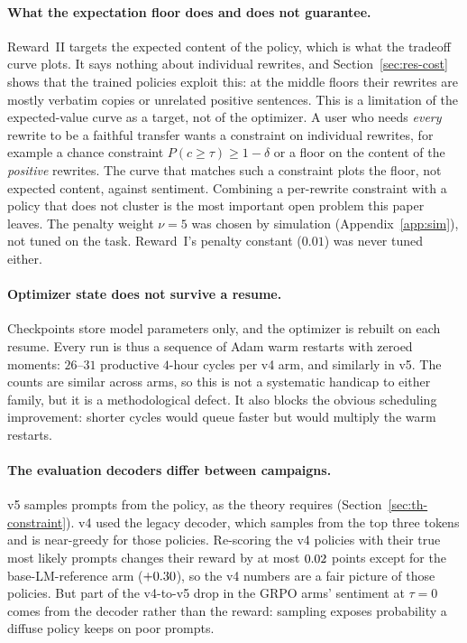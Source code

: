 \paragraph{What the expectation floor does and does not guarantee.}
Reward~II targets the expected content of the policy, which is what the
tradeoff curve plots. It says nothing about individual rewrites, and
Section~\ref{sec:res-cost} shows that the trained policies exploit this: at
the middle floors their rewrites are mostly verbatim copies or unrelated
positive sentences. This is a limitation of the expected-value curve as a
target, not of the optimizer. A user who needs \emph{every} rewrite to be a
faithful transfer wants a constraint on individual rewrites, for example a
chance constraint $P(c \ge \tau) \ge 1-\delta$ or a floor on the content of the
\emph{positive} rewrites. The curve that matches such a constraint plots the
floor, not expected content, against sentiment. Combining a per-rewrite
constraint with a policy that does not cluster is the most important open
problem this paper leaves. The penalty weight
$\nu = 5$ was chosen by simulation (Appendix~\ref{app:sim}), not tuned on the
task. Reward~I's penalty constant ($0.01$) was never tuned either.

\paragraph{Optimizer state does not survive a resume.}
Checkpoints store model parameters only, and the optimizer is rebuilt on each
resume. Every run is thus a sequence of Adam warm restarts with zeroed moments:
$26$--$31$ productive $4$-hour cycles per v4 arm, and similarly in v5. The counts are similar across
arms, so this is not a systematic handicap to either family, but it is a
methodological defect. It also blocks the obvious scheduling improvement:
shorter cycles would queue faster but would multiply the warm restarts.

\paragraph{The evaluation decoders differ between campaigns.}
v5 samples prompts from the policy, as the theory requires (Section~\ref{sec:th-constraint}).
v4 used the legacy decoder, which samples from the top three tokens and is
near-greedy for those policies. Re-scoring the v4 policies with their true most
likely prompts changes their reward by at most $0.02$ points except for the
base-LM-reference arm ($+0.30$), so the v4 numbers are a fair
picture of those policies. But part of the v4-to-v5 drop in the GRPO arms'
sentiment at $\tau = 0$ comes from the decoder rather than the reward: sampling
exposes probability a diffuse policy keeps on poor prompts.

